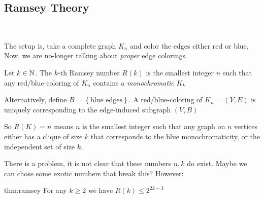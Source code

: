 \subsection{Ramsey Theory}\hfill\\\par
\noindent The setup is, take a complete graph $K_n$ and color the edges either red or blue. Now, we are no-longer talking about \textit{proper} edge colorings.
\par\bigskip
\begin{theo}
  Let $k\in\mathbb{N}$. The $k$-th Ramsey number $R(k)$ is the smallest integer $n$ such that any red/blue coloring of $K_n$ contains a \textit{monochromatic } $K_k$
\end{theo}
\par\bigskip
\noindent Alternatively, define $B =\left\{\text{blue edges}\right\}$. A red/blue-coloring of $K_n = (V,E)$ is uniquely corresponding to the edge-induced subgraph $(V,B)$
\par\bigskip
\noindent So $R(K) = n$ means $n$ is the smallest integer such that any graph on $n$ vertices either has a clique of size $k$  that corresponds to the blue monochromaticity, or the independent set of size $k$.
\par\bigskip
\noindent There is a problem, it is not clear that these numbers $n,k$ do exist. Maybe we can chose some exotic numbers that break this? However:
\par\bigskip
\begin{theo}[Ramsey]{thm:ramsey}
  For any $k\geq 2$ we have $R(k)\leq 2^{2k-3}$
\end{theo}
\par\bigskip
